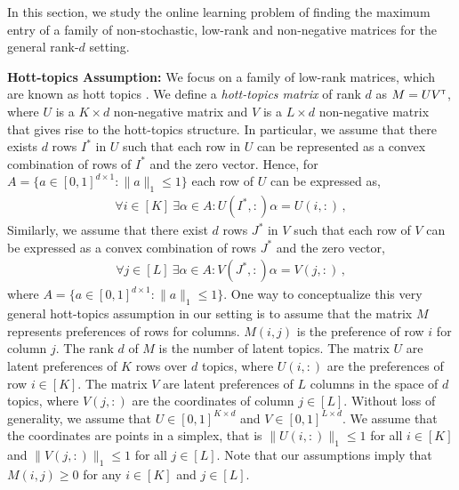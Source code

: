 
In this section, we study the online learning problem of finding the maximum entry of a family of non-stochastic, low-rank and non-negative matrices for the general rank-$d$ setting.  

\textbf{Hott-topics Assumption:} We focus on a family of low-rank matrices, which are known as hott topics \citep{recht2012factoring}. We define a \emph{hott-topics matrix} of rank $d$ as $M = U V^\mathsf{\scriptscriptstyle T}$, where $U$ is a $K \times d$ non-negative matrix and $V$ is a $L \times d$ non-negative matrix that gives rise to the hott-topics structure. In particular, we assume that there exists $d$ rows $I^\ast$ in $U$ such that each row in $U$ can be represented as a convex combination of rows of $I^\ast$ and the zero vector. Hence, for $A = \{a \in [0, 1]^{d \times 1}: \|a\|_1 \leq 1\}$ each row of $U$ can be expressed as,
\begin{align}
  \forall i \in [K] \ \exists \alpha \in A: U(I^\ast, :) \alpha = U(i, :)\,,
  \label{eq:hott topics1}
\end{align}
Similarly, we assume that there exist $d$ rows $J^\ast$ in $V$ such that each row of $V$ can be expressed as a convex combination of rows $J^\ast$ and the zero vector,
\begin{align}
  \forall j \in [L] \ \exists \alpha \in A: V(J^\ast, :) \alpha = V(j, :)\,,
  \label{eq:hott topics}
\end{align}
where $A = \{a \in [0, 1]^{d \times 1}: \|a\|_1 \leq 1\}$. One way to conceptualize this very general hott-topics assumption in our setting  is to assume that the matrix $M$ represents preferences of rows for columns. $M(i, j)$ is the preference of row $i$ for column $j$. The rank $d$ of $M$ is the number of latent topics. The matrix $U$ are latent preferences of $K$ rows over $d$ topics, where $U(i, :)$ are the preferences of row $i \in [K]$. The matrix $V$ are latent preferences of $L$ columns in the space of $d$ topics, where $V(j, :)$ are the coordinates of column $j \in [L]$. Without loss of generality, we assume that $U \in [0, 1]^{K \times d}$ and $V \in [0, 1]^{L \times d}$. We assume that the coordinates are points in a simplex, that is $\|U(i, :)\|_1 \leq 1$ for all $i \in [K]$ and $\|V(j, :)\|_1 \leq 1$ for all $j \in [L]$. Note that our assumptions imply that $M(i, j) \geq 0$ for any $i \in [K]$ and $j \in [L]$.



